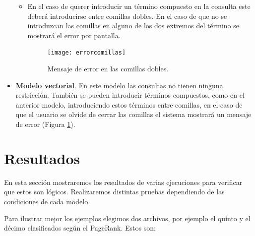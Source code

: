 \documentclass[size=a4, parskip=half, titlepage=false, toc=flat, toc=bib, 12pt, twoside]{scrartcl}
\theoremstyle{theorem-style}
\theoremstyle{definition-style}
\theoremstyle{remark-style}
\theoremstyle{example-style}
\theoremstyle{definition-style}
\theoremstyle{remark-style}
\begin{document}
\begin{itemize}
\begin{itemize}
\begin{figure}[H]
\end{figure}
\item En el caso de querer introducir un término compuesto en la consulta este deberá introducirse entre comillas dobles. En el caso de que no se introduzcan las comillas en alguno de los dos extremos del término se mostrará el error por pantalla.
\begin{figure}[H]
\centering
\texttt{[image: errorcomillas]}
\caption{Mensaje de error en las comillas dobles.}
\label{errorcomillasdobles}
\end{figure}
\end{itemize}
\item \textbf{\underline{Modelo vectorial}}. En este modelo las consultas no tienen ninguna restricción. También se pueden introducir términos compuestos, como en el anterior modelo, introduciendo estos términos entre comillas, en el caso de que el usuario se olvide de cerrar las comillas el sistema mostrará un mensaje de error (Figura \ref{errorcomillasdobles}).

\end{itemize}

\newpage

\section{Resultados}
En esta sección mostraremos los resultados de varias ejecuciones para verificar que estos son lógicos. Realizaremos distintas pruebas dependiendo de las condiciones de cada modelo.

Para ilustrar mejor los ejemplos elegimos dos archivos, por ejemplo el quinto y el décimo clasificados según el PageRank. Estos son:
\end{document}
